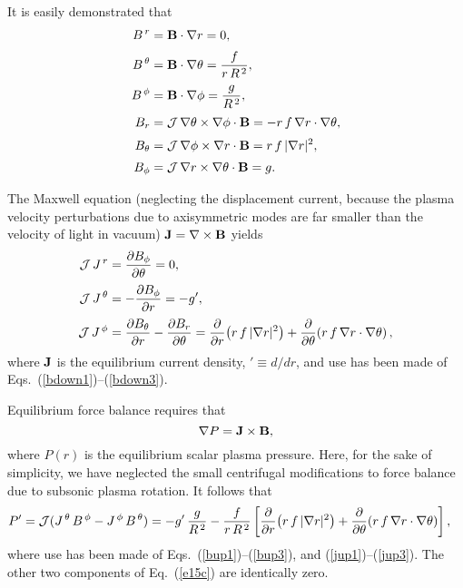\documentclass[12pt,prb,aps,notitlepage]{revtex4-1}
\begin{document}
It is easily demonstrated that
\begin{align}
B^{\,r}&={\bf B}\cdot\nabla r= 0,\label{bup1}\\[0.5ex]
B^{\,\theta} &={\bf B}\cdot\nabla \theta= \frac{f}{r\,R^{\,2}},\label{bup2}\\[0.5ex]
B^{\,\phi} &={\bf B}\cdot\nabla \phi= \frac{g}{R^{\,2}},\label{bup3}\\[0.5ex]
B_r &={\cal J}\,\nabla\theta\times\nabla\phi\cdot{\bf B}= -r\,f\,\nabla r\cdot\nabla\theta,\label{bdown1}\\[0.5ex]
B_\theta &={\cal J}\,\nabla\phi\times\nabla r\cdot{\bf B}= r\,f\,|\nabla r|^2,\\[0.5ex]
B_\phi &={\cal J}\,\nabla r\times\nabla \theta \cdot{\bf B}= g.\label{bdown3}
\end{align}

The Maxwell equation (neglecting the displacement current, because the plasma velocity perturbations due to axisymmetric modes are far smaller than the velocity of light in vacuum)
${\bf J}= \nabla\times{\bf B}$
yields
\begin{align}
{\cal J}\,J^{\,r} &= \frac{\partial B_\phi}{\partial \theta} =0,\label{jup1}\\[0.5ex]
{\cal J}\,J^{\,\theta} &= -\frac{\partial B_\phi}{\partial r} = - g',\label{jup2}\\[0.5ex]
{\cal J}\,J^{\,\phi}&= \frac{\partial B_\theta}{\partial r} -\frac{\partial B_r}{\partial\theta}=\frac{\partial}{\partial r}\!\left(r\,f\,|\nabla r|^2\right)+ \frac{\partial}{\partial\theta}\!\left(r\,f\,\nabla r\cdot\nabla\theta\right),\label{jup3}
\end{align}
where ${\bf J}$ is the equilibrium current density, $'\equiv d/dr$, and use has been made of  Eqs.~(\ref{bdown1})--(\ref{bdown3}).

Equilibrium force balance requires that
\begin{equation}\label{e15c}
 \nabla P={\bf J}\times {\bf B},
\end{equation}
where $P(r)$ is the equilibrium scalar plasma pressure. Here, for the sake of simplicity, we have neglected the small centrifugal modifications to force balance due to subsonic plasma
rotation.
It follows that 
\begin{align}\label{eg1}
P'&= {\cal J}(J^{\,\theta}\,B^{\,\phi}-J^{\,\phi}\,B^{\,\theta})= -g'\,\frac{g}{R^{\,2}} - \frac{f}{r\,R^{\,2}}\left[\frac{\partial}{\partial r}\!\left(r\,f\,|\nabla r|^2\right)+ \frac{\partial}{\partial\theta}\!\left(r\,f\,\nabla r\cdot\nabla\theta\right)\right],
\end{align}
where use has been made of Eqs.~(\ref{bup1})--(\ref{bup3}), and  (\ref{jup1})--(\ref{jup3}). The
other two components of Eq.~(\ref{e15c}) are identically zero. 
\end{document}
